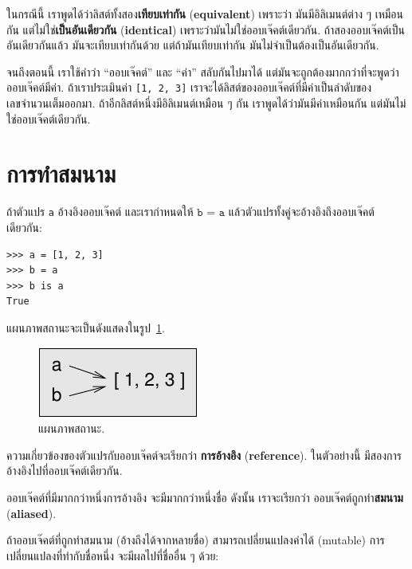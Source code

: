 ในกรณีนี้ เราพูดได้ว่าลิสต์ทั้งสอง\textbf{เทียบเท่ากัน} (\textbf{equivalent})
เพราะว่า มันมีอิลิเมนต์ต่าง ๆ เหมือนกัน
แต่ไม่ใช่\textbf{เป็นอันเดียวกัน} (\textbf{identical})
เพราะว่ามันไม่ใช่ออบเจ๊คต์เดียวกัน.
ถ้าสองออบเจ๊คต์เป็นอันเดียวกันแล้ว มันจะเทียบเท่ากันด้วย
แต่ถ้ามันเทียบเท่ากัน มันไม่จำเป็นต้องเป็นอันเดียวกัน.

จนถึงตอนนี้ เราใช้คำว่า ``ออบเจ๊คต์'' และ ``ค่า'' สลับกันไปมาได้
แต่มันจะถูกต้องมากกว่าที่จะพูดว่าออบเจ๊คต์มีค่า.
%
ถ้าเราประเมินค่า \texttt{[1, 2, 3]}
เราจะได้ลิสต์ของออบเจ๊คต์ที่มีค่าเป็นลำดับของเลขจำนวนเต็มออกมา.  
ถ้าอีกลิสต์หนึ่งมีอิลิเมนต์เหมือน ๆ กัน เราพูดได้ว่ามันมีค่าเหมือนกัน
แต่มันไม่ใช่ออบเจ๊คต์เดียวกัน.


\section{การทำสมนาม}

ถ้าตัวแปร \texttt{a} อ้างอิงออบเจ๊คต์
และเรากำหนดให้ $\texttt{b = a}$
แล้วตัวแปรทั้งคู่จะอ้างอิงถึงออบเจ๊คต์เดียวกัน:

\begin{verbatim}
>>> a = [1, 2, 3]
>>> b = a
>>> b is a
True
\end{verbatim}
%
แผนภาพสถานะจะเป็นดังแสดงในรูป~\ref{fig.list3}.

\begin{figure}
\centerline
{\includegraphics[scale=0.8]{figs/list3.pdf}}
\caption{แผนภาพสถานะ.}
\label{fig.list3}
\end{figure}

ความเกี่ยวข้องของตัวแปรกับออบเจ๊คต์จะเรียกว่า \textbf{การอ้างอิง} (\textbf{reference}).
ในตัวอย่างนี้ มีสองการอ้างอิงไปที่ออบเจ๊คต์เดียวกัน.

ออบเจ๊คต์ที่มีมากกว่าหนึ่งการอ้างอิง จะมีมากกว่าหนึ่งชื่อ
ดังนั้น เราจะเรียกว่า ออบเจ๊คต์ถูกทำ\textbf{สมนาม} (\textbf{aliased}).

ถ้าออบเจ๊คต์ที่ถูกทำสมนาม (อ้างถึงได้จากหลายชื่อ) สามารถเปลี่ยนแปลงค่าได้ (mutable)
การเปลี่ยนแปลงที่ทำกับชื่อหนึ่ง จะมีผลไปที่ชื่ออื่น ๆ ด้วย:


